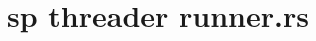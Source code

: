 \documentclass[x11names]{article}
\begin{document}
\section*{sp threader runner.rs}
\providecommand{\cmark}[2][]{%
  \begin{pgfonlayer}{marx}
    \node [nmark] at (c#2#1) {#2};
  \end{pgfonlayer}{marx}
  }
\providecommand{\cmark}[2][]{\relax}
\end{document}
